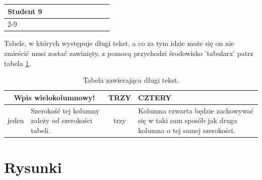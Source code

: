 \begin{longtable}{|p{14ex}|p{1.5em}|p{1.5em}|p{1.5em}|p{1.5em}|p{1.5em}|p{1.5em}|p{1.5em}|p{1.5em}|p{1.5em}|}
     \hline\hline
     Student 9  &   &   &   &   &   &   &   &   & \\
    \cline{2-9}
                &   &   &   &   &   &   &   &   & \\
    \hline\hline
\end{longtable}

Tabele, w których występuje długi tekst, a co za tym idzie może się on nie zmieścić \pauza musi zostać zawinięty, z pomocą przychodzi środowisko 'tabularx' \cite{tabularx} \pauza  patrz tabela \ref{tab:tabularx}.
\begin{table}[!ht]
    \caption{Tabela zawierająca długi tekst\label{tab:tabularx}.}
    \centering
    \begin{tabularx}{300pt}{|c|X|c|X|}
        \hline
        \multicolumn{2}{|c|}{Wpis wielokolumnowy!} &
        TRZY                                       &
        CZTERY                                       \\
        \hline
        jeden                                      &
        \raggedright\arraybackslash Szerokość tej kolumny zależy od
        szerokości tabeli.                         &
        trzy                                       &
        \raggedright\arraybackslash Kolumna czwarta będzie zachowywać się w taki sam sposób jak
        druga kolumna o tej samej szerokości.        \\
        \hline
    \end{tabularx}
\end{table}
\section{Rysunki}


